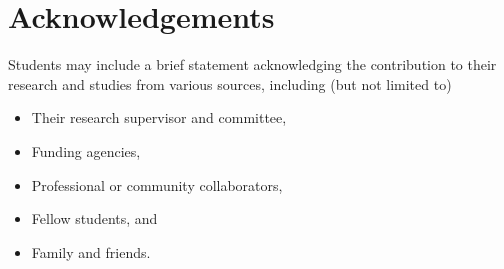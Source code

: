 \section{Acknowledgements}

Students may include a brief statement acknowledging the contribution to their research and studies from various sources, including (but not limited  to)
\begin{itemize}
  \item Their research supervisor and committee,
  \item Funding agencies,
  \item Professional or community collaborators,
  \item Fellow students, and
  \item Family and friends.
\end{itemize}
